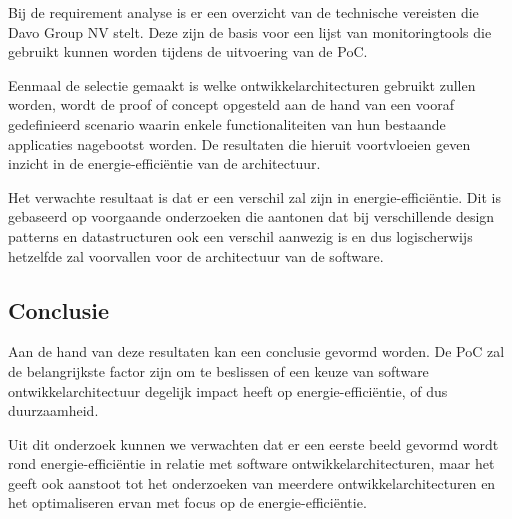 Bij de requirement analyse is er een overzicht van de technische vereisten die Davo Group NV stelt. Deze zijn de basis voor een lijst van monitoringtools die gebruikt kunnen worden tijdens de uitvoering van de PoC.


Eenmaal de selectie gemaakt is welke ontwikkelarchitecturen gebruikt zullen worden, wordt de proof of concept opgesteld aan de hand van een vooraf gedefinieerd scenario waarin enkele functionaliteiten van hun bestaande applicaties nagebootst worden. De resultaten die hieruit voortvloeien geven inzicht in de energie-efficiëntie van de architectuur.

Het verwachte resultaat is dat er een verschil zal zijn in energie-efficiëntie. Dit is gebaseerd op voorgaande onderzoeken die aantonen dat bij verschillende design patterns en datastructuren ook een verschil aanwezig is en dus logischerwijs hetzelfde zal voorvallen voor de architectuur van de software.

\subsection{Conclusie}
Aan de hand van deze resultaten kan een conclusie gevormd worden. De PoC zal de belangrijkste factor zijn om te beslissen of een keuze van software ontwikkelarchitectuur degelijk impact heeft op energie-efficiëntie, of dus duurzaamheid.

Uit dit onderzoek kunnen we verwachten dat er een eerste beeld gevormd wordt rond energie-efficiëntie in relatie met software ontwikkelarchitecturen, maar het geeft ook aanstoot tot het onderzoeken van meerdere ontwikkelarchitecturen en het optimaliseren ervan met focus op de energie-efficiëntie.
%
%

